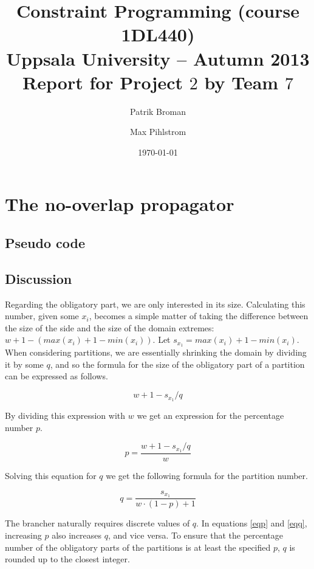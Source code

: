 \documentclass[a4paper,11pt]{article}
\title{\textbf{Constraint Programming (course 1DL440) \\
    Uppsala University -- Autumn 2013 \\
    Report for Project $2$
    by Team $7$  %
  }
}
\author{Patrik Broman \and Max Pihlstrom} %
\date{\today}
\begin{document}
\maketitle
\newpage
\section{The no-overlap propagator}

\subsection{Pseudo code}



\subsection{Discussion}

Regarding the obligatory part, we are only interested in its size. Calculating this number, given some $x_i$, becomes a simple matter of taking the difference between the size of the side and the size of the domain extremes: $w + 1 - (max(x_i) + 1 - min(x_i))$. Let $s_{x_1} = max(x_i) + 1 - min(x_i)$.  When considering partitions, we are essentially shrinking the domain by dividing it by some $q$, and so the formula for the size of the obligatory part of a partition can be expressed as follows.

\begin{equation}
w + 1 - s_{x_1}/q
\end{equation}

By dividing this expression with $w$ we get an expression for the percentage number $p$.

\begin{equation}
\label{eqp}
p = \frac{w + 1 - s_{x_1}/q}{w}
\end{equation}

Solving this equation for $q$ we get the following formula for the partition number.

\begin{equation}
\label{eqq}
q = \frac{s_{x_1}}{w\cdot(1-p)+1}
\end{equation}

The brancher naturally requires discrete values of $q$. In equations \eqref{eqp} and \eqref{eqq}, increasing $p$ also increases $q$, and vice versa. To ensure that the percentage number of the obligatory parts of the partitions is at least the specified $p$, $q$ is rounded up to the closest integer.
\end{document}
